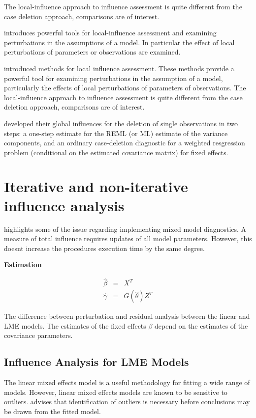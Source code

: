 \documentclass[12pt, a4paper]{report}
\theoremstyle{plain}
\theoremstyle{definition}
\theoremstyle{remark}
\begin{document}
The local-influence approach to influence assessment is quite different from the case deletion approach, comparisons are of
interest. 

\citet{cook86} introduces powerful tools for local-influence assessment and examining perturbations in the assumptions of a model. In particular the effect of local perturbations of parameters or observations are examined.

\citet{cook86} introduced methods for local influence assessment. These methods provide a powerful tool for examining perturbations in the assumption of a model, particularly the effects of local perturbations of parameters of observations. The local-influence approach to influence assessment is quite different from the case deletion approach, comparisons are of interest.

\citet{Christensen} developed their global influences for the deletion of single observations in two steps: a one-step estimate for the REML (or ML) estimate of the variance components, and an ordinary case-deletion diagnostic for a weighted resgression problem (conditional on the estimated covariance matrix) for fixed effects.


\section{Iterative and non-iterative influence analysis}
\citet{schabenberger} highlights some of the issue regarding implementing mixed model diagnostics.
A measure of total influence requires updates of all model parameters.
However, this doesnt increase the procedures execution time by the same degree.

\noindent \textbf{Estimation}

\begin{eqnarray}
\hat{\beta} &=& X^{T} \\
\hat{\gamma} &=& G(\hat{\theta})Z^{T}
\end{eqnarray}

The difference between perturbation and residual analysis between the linear and LME models.
The estimates of the fixed effects $\beta$ depend on the estimates of the covariance parameters.




\subsection{Influence Analysis for LME Models} %
The linear mixed effects model is a useful methodology for fitting a wide range of models. However, linear mixed effects models are known to be sensitive to outliers. \citet{CPJ} advises that identification of outliers is necessary before conclusions may be drawn from the fitted model.
\end{document}
